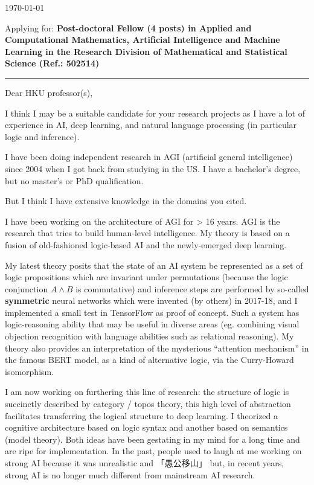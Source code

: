 
\today

{\small Applying for: \textbf{Post-doctoral Fellow (4 posts) in Applied and Computational Mathematics, Artificial Intelligence and Machine Learning in the Research Division of Mathematical and Statistical Science (Ref.: 502514)}}

\begin{center}
	\rule{0.8\textwidth}{1pt}
\end{center}

Dear HKU professor(s),

I think I may be a suitable candidate for your research projects as I have a lot of experience in AI, deep learning, and natural language processing (in particular logic and inference).

I have been doing independent research in AGI (artificial general intelligence) since 2004 when I got back from studying in the US.  I have a bachelor's degree, but no master's or PhD qualification.

But I think I have extensive knowledge in the domains you cited.  

I have been working on the architecture of AGI for > 16 years.  AGI is the research that tries to build human-level intelligence.  My theory is based on a fusion of old-fashioned logic-based AI and the newly-emerged deep learning.

My latest theory posits that the state of an AI system be represented as a set of logic propositions which are invariant under permutations (because the logic conjunction $A \wedge B$ is commutative) and inference steps are performed by so-called \textbf{symmetric} neural networks which were invented (by others) in 2017-18, and I implemented a small test in TensorFlow as proof of concept.  Such a system has logic-reasoning ability that may be useful in diverse areas (eg. combining visual objection recognition with language abilities such as relational reasoning).  My theory also provides an interpretation of the mysterious ``attention mechanism'' in the famous BERT model, as a kind of alternative logic, via the Curry-Howard isomorphism.

I am now working on furthering this line of research:  the structure of logic is succinctly described by category / topos theory, this high level of abstraction facilitates transferring the logical structure to deep learning.  I theorized a cognitive architecture based on logic syntax and another based on semantics (model theory).  Both ideas have been gestating in my mind for a long time and are ripe for implementation.  In the past, people used to laugh at me working on strong AI because it was unrealistic and 「愚公移山」 but, in recent years, strong AI is no longer much different from mainstream AI research.

